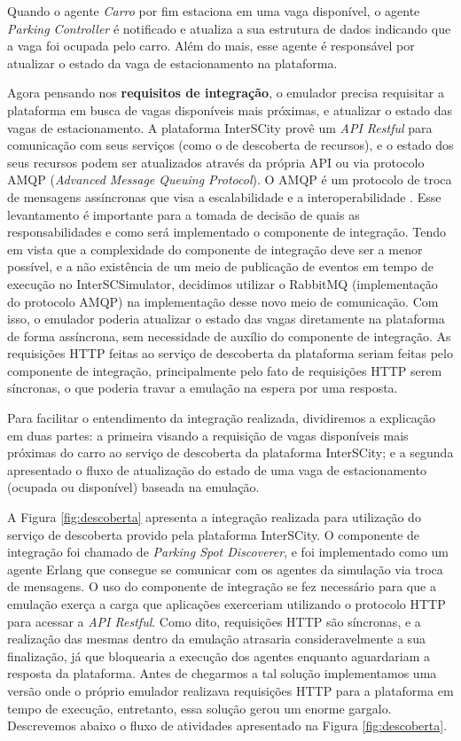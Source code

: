 Quando o agente \textit{Carro} por fim estaciona em uma vaga disponível, o agente \textit{Parking Controller} é notificado e atualiza a sua estrutura de dados indicando
que a vaga foi ocupada pelo carro.
Além do mais, esse agente é responsável por atualizar o estado da vaga de estacionamento na plataforma.

Agora pensando nos \textbf{requisitos de integração}, o emulador precisa requisitar a plataforma em busca de vagas disponíveis mais próximas, e atualizar o estado
das vagas de estacionamento.
A plataforma InterSCity provê um \textit{API Restful} para comunicação com seus serviços (como o de descoberta de recursos), e o estado dos seus recursos podem ser
atualizados através da própria API ou via protocolo AMQP (\textit{Advanced Message Queuing Protocol}).
O AMQP é um protocolo de troca de mensagens assíncronas que visa a escalabilidade e a interoperabilidade \cite{Vin06}.
Esse levantamento é importante para a tomada de decisão de quais as responsabilidades e como será implementado o componente de integração.
Tendo em vista que a complexidade do componente de integração deve ser a menor possível, e a não existência de um meio de publicação de eventos em tempo de execução
no InterSCSimulator, decidimos utilizar o RabbitMQ (implementação do protocolo AMQP) na implementação desse novo meio de comunicação.
Com isso, o emulador poderia atualizar o estado das vagas diretamente na plataforma de forma assíncrona, sem necessidade de auxílio do componente de integração.
As requisições HTTP feitas ao serviço de descoberta da plataforma seriam feitas pelo componente de integração, principalmente pelo fato de requisições HTTP serem
síncronas, o que poderia travar a emulação na espera por uma resposta.

Para facilitar o entendimento da integração realizada, dividiremos a explicação em duas partes: a primeira visando a requisição de vagas disponíveis mais próximas
do carro ao serviço de descoberta da plataforma InterSCity; e a segunda apresentado o fluxo de atualização do estado de uma vaga de estacionamento (ocupada
ou disponível) baseada na emulação.

A Figura \ref{fig:descoberta} apresenta a integração realizada para utilização do serviço de descoberta provido pela plataforma InterSCity.
O componente de integração foi chamado de \textit{Parking Spot Discoverer}, e foi implementado como um agente Erlang que consegue se comunicar com os agentes da
simulação via troca de mensagens.
O uso do componente de integração se fez necessário para que a emulação exerça a carga que aplicações exerceriam utilizando o protocolo HTTP para acessar
a \textit{API Restful}.
Como dito, requisições HTTP são síncronas, e a realização das mesmas dentro da emulação atrasaria consideravelmente a sua finalização, já que bloquearia a
execução dos agentes enquanto aguardariam a resposta da plataforma.
Antes de chegarmos a tal solução implementamos uma versão onde o próprio emulador realizava requisições HTTP para a plataforma em tempo de execução, entretanto,
essa solução gerou um enorme gargalo.
Descrevemos abaixo o fluxo de atividades apresentado na Figura \ref{fig:descoberta}.

